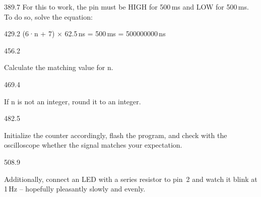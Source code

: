\documentclass{aslab}
\begin{document}
\begin{region}[x=74.7,right=0,pitch=13.1]{389.7}
For this to work, the pin must be HIGH for 500\,ms and LOW for 500\,ms. To
do so, solve the equation:
\end{region}

\begin{region}[x=74.7,right=0]{429.2}
(6·n + 7) × 62.5\,ns = 500\,ms = 500000000\,ns
\end{region}

\begin{region}[x=74.7,right=0]{456.2}
\begin{arrowlist}
\item Calculate the matching value for n.
\end{arrowlist}
\end{region}

\begin{region}[x=74.7,right=0]{469.4}
\begin{arrowlist}
\item If n is not an integer, round it to an integer.
\end{arrowlist}
\end{region}

\begin{region}[x=74.7,right=0,pitch=12.5]{482.5}
\begin{arrowlist}
\item Initialize the counter accordingly, flash the program, and check with
  the oscilloscope whether the signal matches your expectation.
\end{arrowlist}
\end{region}

\begin{region}[x=74.7,right=0,pitch=12.5]{508.9}
\begin{arrowlist}
\item Additionally, connect an LED with a series resistor to pin~2 and
  watch it blink at 1\,Hz -- hopefully pleasantly slowly and evenly.
\end{arrowlist}
\end{region}
\end{document}
